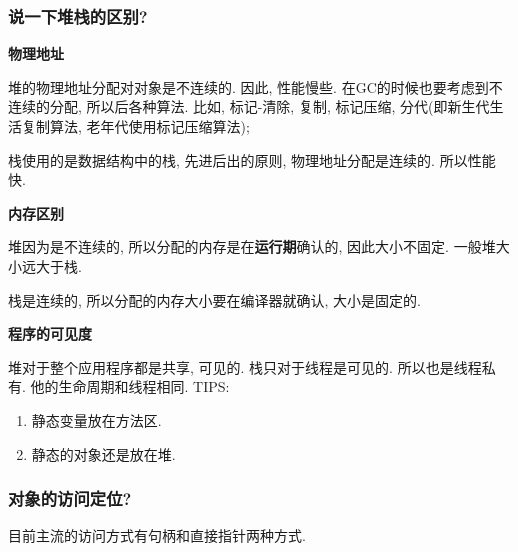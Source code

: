 \documentclass[UTF8]{ctexart}
\begin{document}
\subsubsection{说一下堆栈的区别?}
\textbf{物理地址}
\par
堆的物理地址分配对对象是不连续的. 因此, 性能慢些. 在GC的时候也要考虑到不连续的分配, 所以后各种算法. 比如, 标记-清除, 复制, 标记压缩, 分代(即新生代生活复制算法, 老年代使用标记压缩算法);
\par
栈使用的是数据结构中的栈, 先进后出的原则, 物理地址分配是连续的. 所以性能快.
\par
\textbf{内存区别}
\par
堆因为是不连续的, 所以分配的内存是在\textbf{运行期}确认的, 因此大小不固定. 一般堆大小远大于栈.
\par
栈是连续的, 所以分配的内存大小要在编译器就确认, 大小是固定的.
\par
\textbf{程序的可见度}
\par
堆对于整个应用程序都是共享, 可见的.
栈只对于线程是可见的. 所以也是线程私有. 他的生命周期和线程相同.
TIPS:
\begin{enumerate}
	\item 静态变量放在方法区.
	\item 静态的对象还是放在堆.
\end{enumerate}

\subsubsection{对象的访问定位?}
目前主流的访问方式有句柄和直接指针两种方式.
\end{document}
